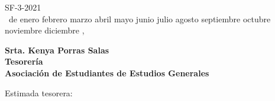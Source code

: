 \documentclass[12pt]{article}
\newcommand{\MONTH}{%
  \ifcase\the\month
  \or enero%
  \or febrero%
  \or marzo%
  \or abril%
  \or mayo%
  \or junio%
  \or julio%
  \or agosto%
  \or septiembre%
  \or octubre%
  \or noviembre%
  \or diciembre%
  \fi}
\begin{document}
\begin{flushright}
  SF-3-2021\\
  \medskip
  \the\day\ de \MONTH, \the\year
\end{flushright}
\medskip
\begin{flushleft}\begin{spacing}{1}
  \textbf{Srta. Kenya Porras Salas\\
  Tesorería\\
  Asociación de Estudiantes de Estudios Generales}
\end{spacing}\end{flushleft}

\noindent Estimada tesorera:\par
\end{document}

